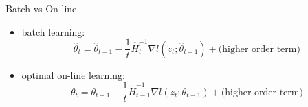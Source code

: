 \documentclass[fleqn,aspectratio=1610]{beamer}
\begin{document}
\begin{frame}[label={sec:org5660141}]{Batch vs On-line}
\begin{itemize}
\item batch learning:
\begin{equation}
  \hat\theta_{t}
  =\hat\theta_{t-1}
  -\frac{1}{t}\hat{H}_{t}^{-1}\nabla l(z_{t};\hat\theta_{t-1})
  +\text{(higher order term)}
\end{equation}
\item optimal on-line learning:
\begin{equation}
  \theta_{t}
  =\theta_{t-1}
  -\frac{1}{t}\tilde{H}_{t-1}^{-1}\nabla l(z_{t};\theta_{t-1})
  +\text{(higher order term)}
\end{equation}
\end{itemize}
\end{frame}
\end{document}
